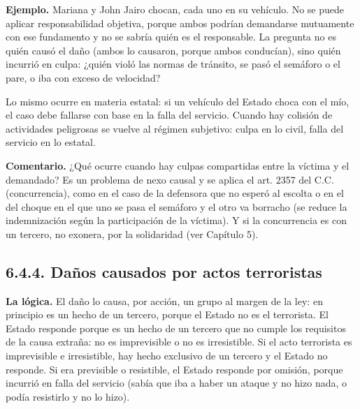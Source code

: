 \begin{ejemplo}
\textcolor[HTML]{4F6228}{\textbf{Ejemplo. }}Mariana y John Jairo chocan, cada uno en su vehículo. No se puede aplicar responsabilidad objetiva, porque ambos podrían demandarse mutuamente con ese fundamento y no se sabría quién es el responsable. La pregunta no es quién causó el daño (ambos lo causaron, porque ambos conducían), sino quién incurrió en culpa: ¿quién violó las normas de tránsito, se pasó el semáforo o el pare, o iba con exceso de velocidad?
\end{ejemplo}
Lo mismo ocurre en materia estatal: si un vehículo del Estado choca con el mío, el caso debe fallarse con base en la falla del servicio. Cuando hay colisión de actividades peligrosas se vuelve al régimen subjetivo: culpa en lo civil, falla del servicio en lo estatal.

\begin{comentario}
\textcolor[HTML]{8A6D3B}{\textbf{Comentario. }}¿Qué ocurre cuando hay culpas compartidas entre la víctima y el demandado? Es un problema de nexo causal y se aplica el art. 2357 del C.C. (concurrencia), como en el caso de la defensora que no esperó al escolta o en el del choque en el que uno se pasa el semáforo y el otro va borracho (se reduce la indemnización según la participación de la víctima). Y si la concurrencia es con un tercero, no exonera, por la solidaridad (ver Capítulo 5).
\end{comentario}
\subsection{6.4.4. Daños causados por actos terroristas}
\textbf{La lógica.} El daño lo causa, por acción, un grupo al margen de la ley: en principio es un hecho de un tercero, porque el Estado no es el terrorista. El Estado responde porque es un hecho de un tercero que no cumple los requisitos de la causa extraña: no es imprevisible o no es irresistible. Si el acto terrorista es imprevisible e irresistible, hay hecho exclusivo de un tercero y el Estado no responde. Si era previsible o resistible, el Estado responde por omisión, porque incurrió en falla del servicio (sabía que iba a haber un ataque y no hizo nada, o podía resistirlo y no lo hizo).

